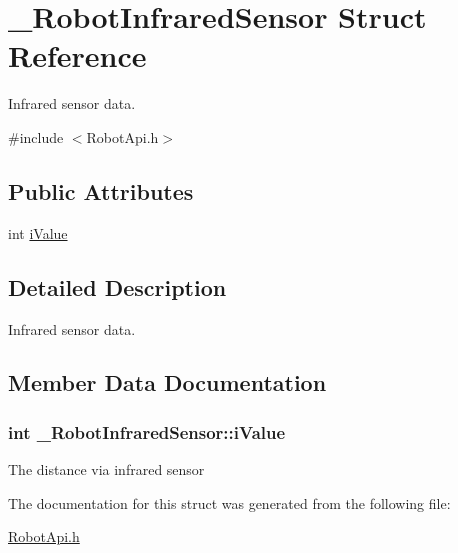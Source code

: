 \hypertarget{struct__RobotInfraredSensor}{\section{\+\_\+\+Robot\+Infrared\+Sensor Struct Reference}
\label{struct__RobotInfraredSensor}
}


Infrared sensor data.  




{\ttfamily \#include $<$Robot\+Api.\+h$>$}

\subsection*{Public Attributes}
\begin{DoxyCompactItemize}
\item 
int \hyperlink{struct__RobotInfraredSensor_adc590c79e4a6f32cc761bb95f6235986}{i\+Value}
\end{DoxyCompactItemize}


\subsection{Detailed Description}
Infrared sensor data. 

\subsection{Member Data Documentation}
\hypertarget{struct__RobotInfraredSensor_adc590c79e4a6f32cc761bb95f6235986}{
\subsubsection[{i\+Value}]{\setlength{\rightskip}{0pt plus 5cm}int \+\_\+\+Robot\+Infrared\+Sensor\+::i\+Value}}\label{struct__RobotInfraredSensor_adc590c79e4a6f32cc761bb95f6235986}
The distance via infrared sensor 

The documentation for this struct was generated from the following file\+:\begin{DoxyCompactItemize}
\item 
\hyperlink{RobotApi_8h}{Robot\+Api.\+h}\end{DoxyCompactItemize}
